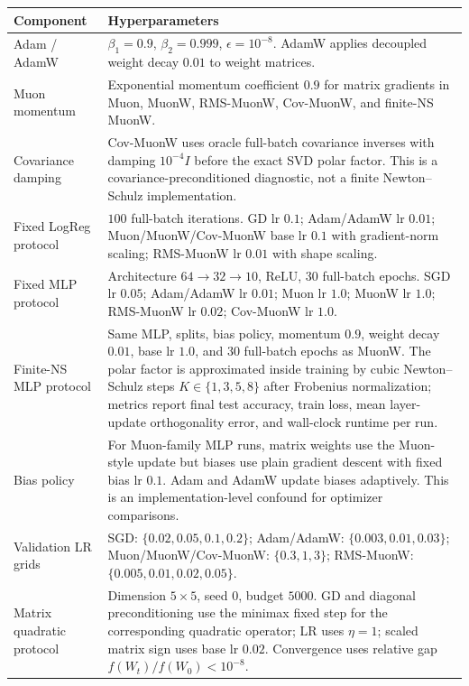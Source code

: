 \scriptsize
\setlength{\tabcolsep}{4pt}
\begin{tabular}{p{}p{}}
\toprule
Component & Hyperparameters \\
\midrule
Adam / AdamW & $\beta_1=0.9$, $\beta_2=0.999$, $\epsilon=10^{-8}$. AdamW applies decoupled weight decay $0.01$ to weight matrices. \\
Muon momentum & Exponential momentum coefficient $0.9$ for matrix gradients in Muon, MuonW, RMS-MuonW, Cov-MuonW, and finite-NS MuonW. \\
Covariance damping & Cov-MuonW uses oracle full-batch covariance inverses with damping $10^{-4}I$ before the exact SVD polar factor. This is a covariance-preconditioned diagnostic, not a finite Newton--Schulz implementation. \\
Fixed LogReg protocol & $100$ full-batch iterations. GD lr $0.1$; Adam/AdamW lr $0.01$; Muon/MuonW/Cov-MuonW base lr $0.1$ with gradient-norm scaling; RMS-MuonW lr $0.01$ with shape scaling. \\
Fixed MLP protocol & Architecture $64\to32\to10$, ReLU, $30$ full-batch epochs. SGD lr $0.05$; Adam/AdamW lr $0.01$; Muon lr $1.0$; MuonW lr $1.0$; RMS-MuonW lr $0.02$; Cov-MuonW lr $1.0$. \\
Finite-NS MLP protocol & Same MLP, splits, bias policy, momentum $0.9$, weight decay $0.01$, base lr $1.0$, and $30$ full-batch epochs as MuonW. The polar factor is approximated inside training by cubic Newton--Schulz steps $K\in\{1,3,5,8\}$ after Frobenius normalization; metrics report final test accuracy, train loss, mean layer-update orthogonality error, and wall-clock runtime per run. \\
Bias policy & For Muon-family MLP runs, matrix weights use the Muon-style update but biases use plain gradient descent with fixed bias lr $0.1$. Adam and AdamW update biases adaptively. This is an implementation-level confound for optimizer comparisons. \\
Validation LR grids & SGD: $\{0.02,0.05,0.1,0.2\}$; Adam/AdamW: $\{0.003,0.01,0.03\}$; Muon/MuonW/Cov-MuonW: $\{0.3,1,3\}$; RMS-MuonW: $\{0.005,0.01,0.02,0.05\}$. \\
Matrix quadratic protocol & Dimension $5\times5$, seed $0$, budget $5000$. GD and diagonal preconditioning use the minimax fixed step for the corresponding quadratic operator; LR uses $\eta=1$; scaled matrix sign uses base lr $0.02$. Convergence uses relative gap $f(W_t)/f(W_0)<10^{-8}$. \\
\bottomrule
\end{tabular}
